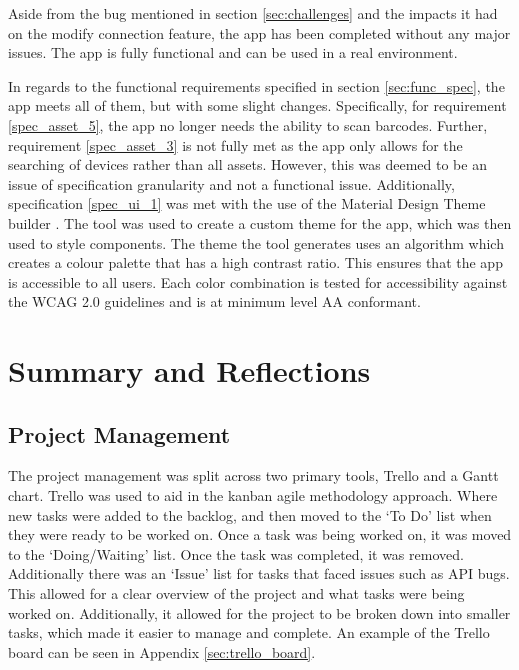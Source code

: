 \documentclass [11pt,a4paper]{article}
\begin{document}
Aside from the bug mentioned in section \ref{sec:challenges} and the impacts it had on the modify connection feature, the app has been completed without any major issues. The app is fully functional and can be used in a real environment. 

In regards to the functional requirements specified in section \ref{sec:func_spec}, the app meets all of them, but with some slight changes. Specifically, for requirement \ref{spec_asset_5}, the app no longer needs the ability to scan barcodes. Further, requirement \ref{spec_asset_3} is not fully met as the app only allows for the searching of devices rather than all assets. However, this was deemed to be an issue of specification granularity and not a functional issue. Additionally, specification \ref{spec_ui_1} was met with the use of the Material Design Theme builder \cite{material3ColourTool}. The tool was used to create a custom theme for the app, which was then used to style components. The theme the tool generates uses an algorithm which creates a colour palette that has a high contrast ratio. This ensures that the app is accessible to all users. Each color combination is tested for accessibility against the WCAG 2.0 guidelines \cite{caldwell2008web} and is at minimum level AA conformant.

\section{Summary and Reflections}
\label{sec:summary}
\subsection{Project Management}
\label{sec:project_management_summary}

The project management was split across two primary tools, Trello and a Gantt chart. Trello was used to aid in the kanban agile methodology approach. Where new tasks were added to the backlog, and then moved to the `To Do' list when they were ready to be worked on. Once a task was being worked on, it was moved to the `Doing/Waiting' list. Once the task was completed, it was removed. Additionally there was an `Issue' list for tasks that faced issues such as API bugs. This allowed for a clear overview of the project and what tasks were being worked on. Additionally, it allowed for the project to be broken down into smaller tasks, which made it easier to manage and complete. An example of the Trello board can be seen in Appendix \ref{sec:trello_board}.
\end{document}
